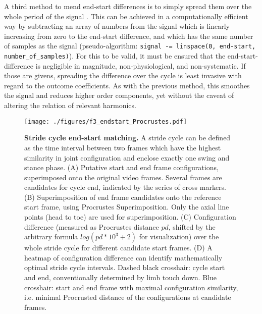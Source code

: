 \documentclass[10pt,a4paper]{article}
\begin{document}
A third method to mend end-start differences is to simply spread them over the whole period of the signal \citep{Mielke2019}.
This can be achieved in a computationally efficient way by subtracting an array of numbers from the signal which is linearly increasing from zero to the end-start difference, and which has the same number of samples as the signal (pseudo-algorithm: \texttt{signal -= linspace(0, end-start, number\_of\_samples)}).
For this to be valid, it must be ensured that the end-start-difference is negligible in magnitude, non-physiological, and non-systematic.
If those are givens, spreading the difference over the cycle is least invasive with regard to the outcome coefficients.
As with the previous method, this smoothes the signal and reduces higher order components, yet without the caveat of altering the relation of relevant harmonics.



\begin{figure}[pt]
\centering
\texttt{[image: ./figures/f3\_endstart\_Procrustes.pdf]}
\caption{\label{fig:endstart}\textbf{Stride cycle end-start matching.} A stride cycle can be defined as the time interval between two frames which have the highest similarity in joint configuration and enclose exactly one swing and stance phase. (A) Putative start and end frame configurations, superimposed onto the original video frames. Several frames are candidates for cycle end, indicated by the series of cross markers. (B) Superimposition of end frame candidates onto the reference start frame, using Procrustes Superimposition. Only the axial line points (head to toe) are used for superimposition. (C) Configuration difference (measured as Procrustes distance \(pd\), shifted by the arbitrary formula \(log\left(pd*10^3+2\right)\) for visualization) over the whole stride cycle for different candidate start frames. (D) A heatmap of configuration difference can identify mathematically optimal stride cycle intervals. Dashed black crosshair: cycle start and end, conventionally determined by limb touch down. Blue crosshair: start and end frame with maximal configuration similarity, i.e. minimal Procrusted distance of the configurations at candidate frames.}
\end{figure}
\end{document}
